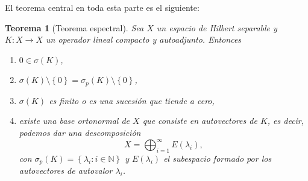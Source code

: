 \documentclass[12pt,a4paper]{article}
\newtheorem{thm}{Teorema}[section]
\theoremstyle{definition} \newtheorem{defn}[thm]{Definición}
\theoremstyle{definition} \newtheorem{ejemplo}[thm]{Ejemplo}
\theoremstyle{definition} \newtheorem{ejercicio}[thm]{Ejercicio}
\theoremstyle{remark} \newtheorem*{obs}{Observación}
\begin{document}
 El teorema central en toda esta parte es el siguiente:
 \begin{thm}[Teorema espectral]
   Sea $X$ un espacio de Hilbert separable y $K:X\rightarrow X$ un operador lineal compacto y autoadjunto. Entonces 
   \begin{enumerate}
     \item $0 \in \sigma(K)$,
     \item $\sigma(K) \setminus \left\{ 0 \right\} = \sigma_p(K) \setminus \left\{ 0 \right\}$,
     \item $\sigma(K)$ es finito o es una sucesión que tiende a cero,
     \item existe una base ortonormal de $X$ que consiste en autovectores de $K$, es decir, podemos dar una descomposición
       \begin{equation*}
	 X=\bigoplus_{i=1}^\infty E(\lambda_i),
       \end{equation*}
       con $\sigma_p(K)=\left\{ \lambda_i: i\in \mathbb{N} \right\}$ y $E(\lambda_i)$ el subespacio formado por los autovectores de autovalor $\lambda_i$.
   \end{enumerate}
 \end{thm}
\end{document}
